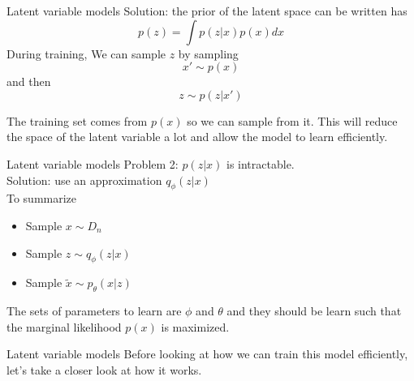 \documentclass{beamer}
\begin{document}
\begin{frame}{Latent variable models}
	Solution: the prior of the latent space can be written has
	\[
	p(z) = \int p(z|x) p(x) dx
	\]
	During training, We can sample $z$ by sampling \\
	\[
	x'\sim p(x)
	\]
	and then 
	\[z\sim p(z|x')\]
	
	 The training set comes from $p(x)$ so we can sample from it. This will reduce the space of the latent variable a lot and allow the model to learn efficiently.
\end{frame}

\begin{frame}{Latent variable models}
	Problem 2: $p(z|x)$ is intractable. \\
	
	Solution: use an approximation $q_\phi(z|x)$\\
	
	To summarize
	\begin{itemize}
		\item Sample $x \sim D_n$
		\item Sample $z \sim q_\phi(z|x)$
		\item Sample $\tilde{x} \sim p_\theta(x|z)$
	\end{itemize}
	The sets of parameters to learn are $\phi$ and $\theta$ and they should be learn such that the marginal likelihood $p(x)$ is maximized.
\end{frame}

\begin{frame}{Latent variable models}
	Before looking at how we can train this model efficiently, let's take a closer look at how it works.
\end{frame}
\end{document}
